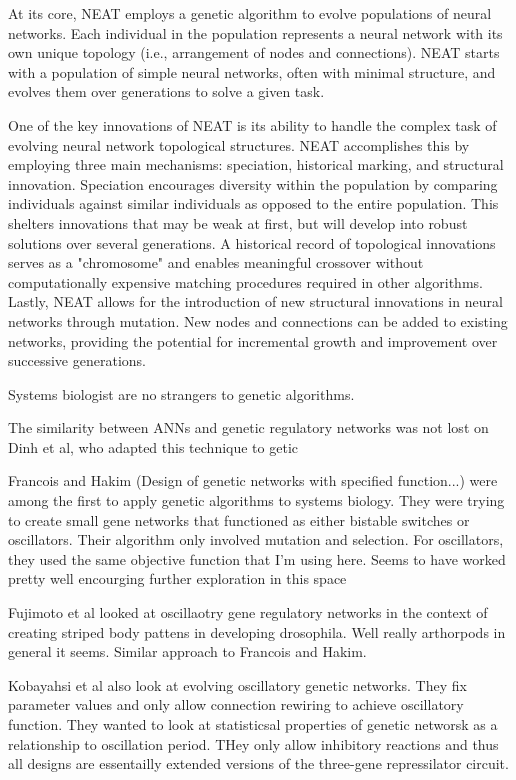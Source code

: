 \documentclass[12pt]{report}
\begin{document}
At its core, NEAT employs a genetic algorithm to evolve populations of neural networks. Each individual in the population represents a neural network with its own unique topology (i.e., arrangement of nodes and connections). NEAT starts with a population of simple neural networks, often with minimal structure, and evolves them over generations to solve a given task.

One of the key innovations of NEAT is its ability to handle the complex task of evolving neural network topological structures. NEAT accomplishes this by employing three main mechanisms: speciation, historical marking, and structural innovation. Speciation encourages diversity within the population by comparing individuals against similar individuals as opposed to the entire population. This shelters innovations that may be weak at first, but will develop into robust solutions over several generations. A historical record of topological innovations serves as a "chromosome" and enables meaningful crossover without computationally expensive matching procedures required in other algorithms. Lastly, NEAT allows for the introduction of new structural innovations in neural networks through mutation. New nodes and connections can be added to existing networks, providing the potential for incremental growth and improvement over successive generations.


Systems biologist are no strangers to genetic algorithms. 

The similarity between ANNs and genetic regulatory networks was not lost on Dinh et al, who adapted this technique to getic

Francois and Hakim (Design of genetic networks with specified function...) were among the first to apply genetic algorithms to systems biology. They were trying to create small gene networks that functioned as either bistable switches or oscillators. Their algorithm only involved mutation and selection. For oscillators, they used the same objective function that I'm using here. Seems to have worked pretty well encourging further exploration in this space

Fujimoto et al looked at oscillaotry gene regulatory networks in the context of creating striped body pattens in developing drosophila. Well really arthorpods in general it seems. Similar approach to Francois and Hakim.

Kobayahsi et al also look at evolving oscillatory genetic networks. They fix parameter values and only allow connection rewiring to achieve oscillatory function. They wanted to look at statisticsal properties of genetic networsk as a relationship to oscillation period. THey only allow inhibitory reactions and thus all designs are essentailly extended versions of the three-gene repressilator circuit.
\end{document}
